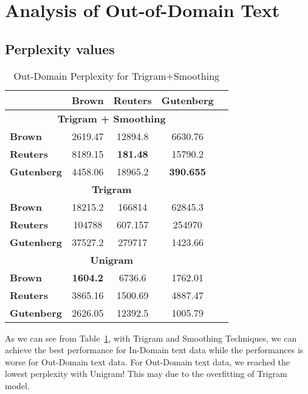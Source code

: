 \section{\textbf{Analysis of Out-of-Domain Text}}

\subsection{\textbf{Perplexity values}}

\begin{table}[ht]  %
\centering  %
\caption{Out-Domain Perplexity for Trigram+Smoothing}
\begin{tabular}{lcccc}
\hline
           &   \textbf{Brown} &   \textbf{Reuters} &   \textbf{Gutenberg} \\
\hline
    \multicolumn{4}{c}{\textbf{Trigram + Smoothing}} \\
\hline
 \textbf{Brown}     & 2619.47 &  12894.8  &    6630.76  \\
 \textbf{Reuters}   & 8189.15 &    \textbf{181.48} &   15790.2   \\
 \textbf{Gutenberg} & 4458.06 &  18965.2  &     \textbf{390.655} \\
\hline
    \multicolumn{4}{c}{\textbf{Trigram}} \\
\hline
 \textbf{Brown}     &  18215.2 & 166814     &    62845.3  \\
 \textbf{Reuters}   & 104788   &    607.157 &   254970    \\
 \textbf{Gutenberg} &  37527.2 & 279717     &     1423.66 \\
\hline
    \multicolumn{4}{c}{\textbf{Unigram}} \\
\hline
 \textbf{Brown}     & \textbf{1604.2}  &   6736.6  &     1762.01 \\
 \textbf{Reuters}   & 3865.16 &   1500.69 &     4887.47 \\
 \textbf{Gutenberg} & 2626.05 &  12392.5  &     1005.79 \\
\hline
\end{tabular}
\label{tab:out-domain}
\end{table}

As we can see from Table~\ref{tab:out-domain}, with Trigram and Smoothing Techniques, we can achieve the best performance for In-Domain text data while the performances is worse for Out-Domain text data. For Out-Domain text data, we reached the lowest perplexity with Unigram! This may due to the overfitting of Trigram model. 

